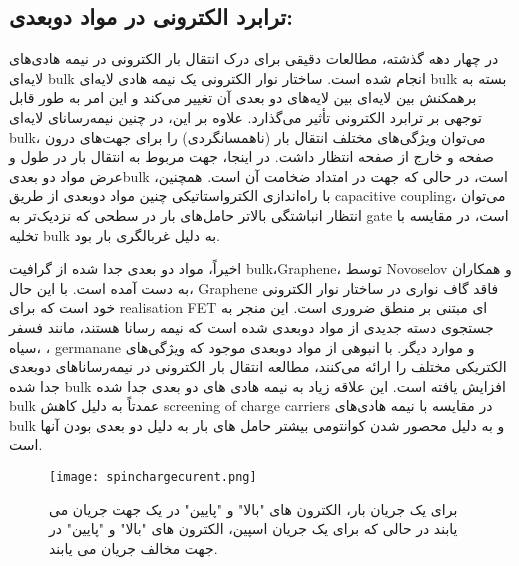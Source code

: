 \subsection{ترابرد الکترونی در مواد دو‌بعدی:}
در چهار دهه گذشته، مطالعات دقیقی برای درک انتقال بار الکترونی در نیمه هادی‌های لایه‌ای \gls{bulk}  انجام شده است.
ساختار نوار الکترونی یک نیمه هادی لایه‌ای \gls{bulk} بسته به برهمکنش بین لایه‌ای بین لایه‌های دو بعدی آن تغییر می‌کند و این امر به طور قابل توجهی بر ترابرد الکترونی تأثیر می‌گذارد. علاوه بر این، در چنین نیمه‌رسانای لایه‌ای \gls{bulk}، می‌توان ویژگی‌های مختلف انتقال بار (ناهمسانگردی) را برای جهت‌های درون صفحه  و خارج از صفحه  انتظار داشت. در اینجا، جهت  مربوط به انتقال بار در طول و عرض مواد دو بعدی\gls{bulk} است، در حالی که جهت  در امتداد ضخامت آن است. همچنین، با راه‌اندازی الکترواستاتیکی چنین مواد دو‌بعدی از طریق \gls{capacitive coupling}، می‌توان انتظار انباشتگی بالاتر حامل‌های بار در سطحی که نزدیک‌تر به \gls{gate} است، در مقایسه با تخلیه \gls{bulk} به دلیل غربالگری بار بود.

اخیراً، مواد دو بعدی جدا شده از گرافیت \gls{bulk}،\gls{Graphene}، توسط \gls{Novoselov} و همکاران\cite{novoselov2004electric} به دست آمده است. با این حال، \gls{Graphene} فاقد گاف نواری در ساختار نوار الکترونی خود است که برای \gls{realisation} \gls{FET} ای مبتنی بر منطق ضروری است. این منجر به جستجوی دسته جدیدی از مواد دو‌بعدی شده است که نیمه رسانا هستند، مانند فسفر سیاه\cite{li2014black}، \cite{radisavljevic2011single}، \gls{germanane}\cite{madhushankar2017electronic} و موارد دیگر. با انبوهی از مواد دوبعدی موجود که ویژگی‌های الکتریکی مختلف را ارائه می‌کنند، مطالعه انتقال بار الکترونی در نیمه‌رساناهای دو‌بعدی جدا شده \gls{bulk} افزایش یافته است. این علاقه زیاد به نیمه هادی های دو بعدی جدا شده \gls{bulk} عمدتاً به دلیل کاهش \gls{screening of charge carriers} در مقایسه با نیمه هادی‌های \gls{bulk} و به دلیل محصور شدن کوانتومی بیشتر حامل های بار به دلیل دو بعدی بودن آنها است.

\begin{figure*}[!ht]
    \centering
    \texttt{[image: spinchargecurent.png]}
    \caption{برای یک جریان بار، الکترون های "بالا" و "پایین" در یک جهت جریان می یابند در حالی که برای یک جریان اسپین، الکترون های "بالا" و "پایین" در جهت مخالف جریان می یابند.}
    \label{fig:spinchargecurent}
\end{figure*}

